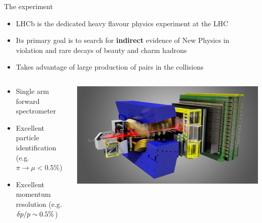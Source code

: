 \documentclass[aspectratio=1610]{beamer}
\begin{document}
\begin{frame}{The \lhcb experiment}
  \begin{itemize}
  \item LHCb is the dedicated heavy flavour physics experiment at the LHC 
  \item Its primary goal is to search for {\bf indirect} evidence of New Physics in \CP violation and rare decays of beauty and charm hadrons
  \item Takes advantage of large production of \bquark\bquarkbar pairs in the \proton\proton collisions
  \end{itemize}

   \bigskip
    
   \begin{columns}
   \begin{column}{0.4\textwidth}
    \begin{itemize}
      \item Single arm forward spectrometer
      \item Excellent particle identification \mbox{(e.g. $\pi \to \mu <0.5\%$)}
      \item Excellent momentum resolution \mbox{(e.g. $\delta\mbox{$p$}/\mbox{$p$} \sim 0.5\%$)}
    \end{itemize}
    \end{column}
   \begin{column}{0.6\textwidth}
      \includegraphics[width=\textwidth]{figs/lhcb/lhcb2.png}
    \end{column}
   \end{columns}
\end{frame}
\end{document}
